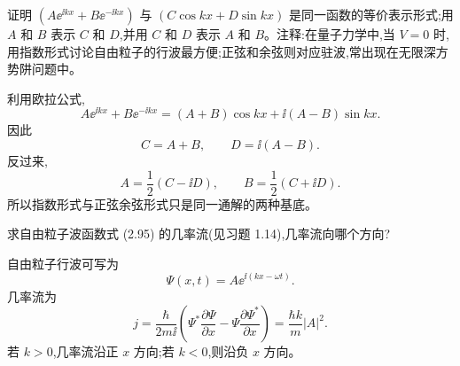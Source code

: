 \begin{question}
证明 $(A\ee^{\ii kx}+B\ee^{-\ii kx})$ 与 $(C\cos kx+D\sin kx)$ 是同一函数的等价表示形式;用 $A$ 和 $B$ 表示 $C$ 和 $D$,并用 $C$ 和 $D$ 表示 $A$ 和 $B$。注释:在量子力学中,当 $V=0$ 时,用指数形式讨论自由粒子的行波最方便;正弦和余弦则对应驻波,常出现在无限深方势阱问题中。
\begin{solution}
利用欧拉公式,
\[
A\ee^{\ii kx}+B\ee^{-\ii kx}
=(A+B)\cos kx+\ii(A-B)\sin kx.
\]
因此
\[
C=A+B,
\qquad
D=\ii(A-B).
\]
反过来,
\[
A=\frac12(C-\ii D),
\qquad
B=\frac12(C+\ii D).
\]
所以指数形式与正弦余弦形式只是同一通解的两种基底。
\end{solution}
\end{question}

\begin{question}
求自由粒子波函数式 (2.95) 的几率流(见习题 1.14),几率流向哪个方向?

\par\smallskip
{}

\begin{solution}
自由粒子行波可写为
\[
\Psi(x,t)=A\ee^{\ii(kx-\omega t)}.
\]
几率流为
\[
j=\frac{\hbar}{2m\ii}\left(\Psi^*\frac{\partial\Psi}{\partial x}-\Psi\frac{\partial\Psi^*}{\partial x}\right)
=\frac{\hbar k}{m}|A|^2.
\]
若 $k>0$,几率流沿正 $x$ 方向;若 $k<0$,则沿负 $x$ 方向。
\end{solution}
\end{question}

